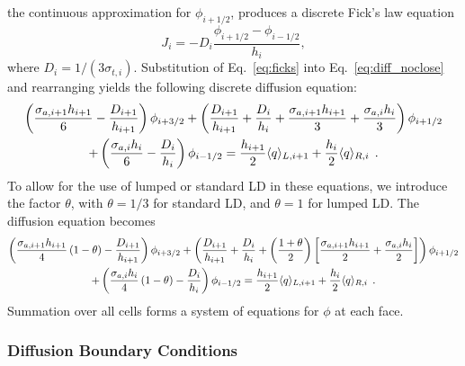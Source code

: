 the continuous approximation for $\phi_{i+1/2}$, produces a discrete Fick's law equation~\cite{stacy}
\begin{equation}\label{eq:ficks}
    J_{i} = -D_i \frac{\phi_{i+1/2} - \phi_{i-1/2}}{h_i},
\end{equation}
where $D_i = 1/(3\sigma_{t,i})$.
Substitution of Eq.~\eqref{eq:ficks} into Eq.~\eqref{eq:diff_noclose} and rearranging yields the following discrete diffusion
equation:
\begin{multline}
        \left(\frac{\sigma_{a,i+1} h_{i+1}}{6} -
        \frac{D_{i+1}}{h_{i+1}}\right)\phi_{i+3/2} + \left(\frac{D_{i+1}}{h_{i+1}} +
        \frac{D_{i}}{h_i} + \frac{\sigma_{a,i+1} h_{i+1}}{3} + \frac{\sigma_{a,i}
        h_{i}}{3}\right)\phi_{i+1/2} \\ + \left(\frac{\sigma_{a,i} h_{i}}{6} -
        \frac{D_{i}}{h_{i}}\right)\phi_{i-1/2} = \frac{h_{i+1}}{2} \langle q \rangle_{L,i+1} +
        \frac{h_{i}}{2}\langle q \rangle_{R,i}\;\,. 
\end{multline}
To allow for the use of lumped
or standard LD in these equations, we introduce the factor $\theta$, with
$\theta=1/3$ for standard
LD, and $\theta=1$ for lumped LD.  The diffusion equation becomes
\begin{multline}\label{eq:dsa_lumped}
    \left(\frac{\sigma_{a,i+1} h_{i+1}}{4}\left(1 - \theta\right)  -
        \frac{D_{i+1}}{h_{i+1}}\right)\phi_{i+3/2} + \left(\frac{D_{i+1}}{h_{i+1}} +
        \frac{D_{i}}{h_i} + \left(\frac{1+\theta}{2} \right)\left[\frac{\sigma_{a,i+1} h_{i+1}}{2} + \frac{\sigma_{a,i}
        h_{i}}{2}\right]\right)\phi_{i+1/2} \\ + \left(\frac{\sigma_{a,i}
        h_{i}}{4}\left(1 - \theta\right) -
        \frac{D_{i}}{h_{i}}\right)\phi_{i-1/2} = \frac{h_{i+1}}{2} \langle q \rangle_{L,i+1} +
        \frac{h_{i}}{2}\langle q \rangle_{R,i}
        \;\,. 
\end{multline}
Summation over all cells forms a system of equations for $\phi$ at each face.  

\subsubsection{Diffusion Boundary Conditions}

